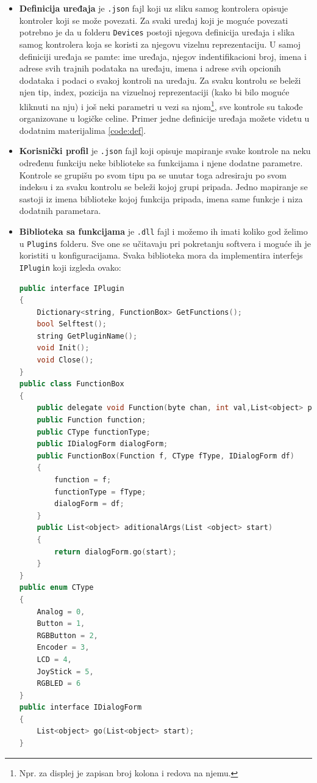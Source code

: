 \documentclass[12pt,oneside]{memoir}
\begin{document}
	\begin{itemize}
		\item \textbf{Definicija uređaja} je \verb|.json| fajl koji uz sliku samog kontrolera opisuje kontroler koji se može povezati.
		Za svaki uređaj koji je moguće povezati potrebno je da u folderu \verb|Devices| postoji njegova definicija uređaja i slika samog kontrolera koja se koristi za njegovu vizelnu reprezentaciju. U samoj definiciji uređaja se pamte: ime uređaja, njegov indentifikacioni broj, imena i adrese svih trajnih podataka na uređaju, imena i adrese svih opcionih dodataka i podaci o svakoj kontroli na uređaju.
		Za svaku kontrolu se beleži njen tip, index, pozicija na vizuelnoj reprezentaciji (kako bi bilo moguće kliknuti na nju) i još neki parametri u vezi sa njom\footnote{Npr. za displej je zapisan broj kolona i redova na njemu.}, sve kontrole su takođe organizovane u logičke celine. Primer jedne definicije uređaja možete videtu u dodatnim materijalima \ref{code:def}.
		\item  \textbf{Korisnički profil} je \verb|.json| fajl koji opisuje mapiranje svake kontrole na neku određenu funkciju neke biblioteke sa funkcijama i njene dodatne parametre. Kontrole se grupišu po svom tipu pa se unutar toga adresiraju po svom indeksu i za svaku kontrolu se beleži kojoj grupi pripada. Jedno mapiranje se sastoji iz imena biblioteke kojoj funkcija pripada, imena same funkcje i niza dodatnih parametara.
		\item \textbf{Biblioteka sa funkcijama} je \verb|.dll| fajl i možemo ih imati koliko god želimo u \verb|Plugins| folderu. Sve one se učitavaju pri pokretanju softvera i moguće ih je koristiti u konfiguracijama. Svaka biblioteka mora da implementira interfejs \verb|IPlugin| koji izgleda ovako:
		\begin{lstlisting}[language=C++,tabsize=2]
public interface IPlugin
{
	Dictionary<string, FunctionBox> GetFunctions();
	bool Selftest();
	string GetPluginName();
	void Init();
	void Close();
}
public class FunctionBox
{
	public delegate void Function(byte chan, int val,List<object> par);
	public Function function;
	public CType functionType;
	public IDialogForm dialogForm;
	public FunctionBox(Function f, CType fType, IDialogForm df)
	{
		function = f;
		functionType = fType;
		dialogForm = df;
	}
	public List<object> aditionalArgs(List <object> start)
	{
		return dialogForm.go(start);
	}
}
public enum CType
{
	Analog = 0,
	Button = 1,
	RGBButton = 2,
	Encoder = 3,
	LCD = 4,
	JoyStick = 5,
	RGBLED = 6
}
public interface IDialogForm
{
	List<object> go(List<object> start);
}
		\end{lstlisting}
	\end{itemize}
\end{document}
